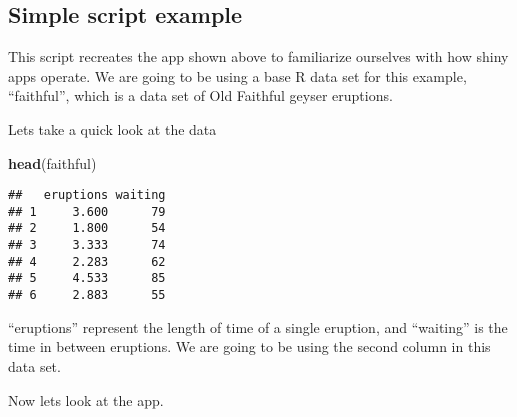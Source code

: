 \documentclass[]{article}
\newenvironment{Shaded}{\begin{snugshade}}{\end{snugshade}}
\newcommand{\KeywordTok}[1]{\textcolor[rgb]{0.13,0.29,0.53}{\textbf{#1}}}
\newcommand{\NormalTok}[1]{#1}
\begin{document}
\hypertarget{simple-script-example}{%
\subsection{Simple script example}\label{simple-script-example}}

This script recreates the app shown above to familiarize ourselves with
how shiny apps operate. We are going to be using a base R data set for
this example, ``faithful'', which is a data set of Old Faithful geyser
eruptions.

Lets take a quick look at the data

\begin{Shaded}
\begin{Highlighting}[]
\KeywordTok{head}\NormalTok{(faithful)}
\end{Highlighting}
\end{Shaded}

\begin{verbatim}
##   eruptions waiting
## 1     3.600      79
## 2     1.800      54
## 3     3.333      74
## 4     2.283      62
## 5     4.533      85
## 6     2.883      55
\end{verbatim}

``eruptions'' represent the length of time of a single eruption, and
``waiting'' is the time in between eruptions. We are going to be using
the second column in this data set.

Now lets look at the app.
\end{document}

